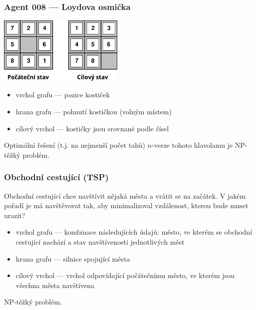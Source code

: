 \documentclass[red,professionalfont]{beamer}
\theoremstyle{definition}
\newcommand{\0}{\mbox{${\bf 0}$}}
\begin{document}
\begin{frame}\frametitle{Agent 008 --- Loydova osmička}
\begin{center}
 \includegraphics[width=6cm]{loydova-osmicka.pdf}
\end{center}\pause
\begin{itemize}
 \item vrchol grafu \pause --- pozice kostiček \pause
 \item hrana grafu \pause --- pohnutí kostičkou (volným místem)\pause
 \item cílový vrchol \pause --- kostičky jsou srovnané podle čísel\pause
\end{itemize}
\begin{block}{}
 Optimální řešení (t.j. na nejmenší počet tahů) $n$-verze tohoto hlavolamu je NP-těžký problém.
\end{block}

\end{frame}

\begin{frame}\frametitle{Obchodní cestující (TSP)}
\begin{block}{} Obchodní cestující chce navštívit nějaká města a vrátit se na začátek. V jakém pořadí je má navštěvovat tak, aby 
minimalizoval vzdálenost, kterou bude muset urazit?\pause
\end{block}
\begin{itemize}
 \item vrchol grafu \pause --- kombinace následujících údajů: město, ve kterém se obchodní cestující nachází \pause a  stav navštívenosti jednotlivých měst\pause
 \item hrana grafu \pause --- silnice spojující města\pause
 \item cílový vrchol \pause --- vrchol odpovídající počátečnímu město, ve kterém jsou všechna města navštívena
\end{itemize}\pause
NP-těžký problém.
\end{frame}
\end{document}
